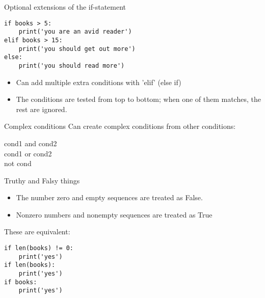 \documentclass{beamer}
\begin{document}
\begin{frame}[fragile]{Optional extensions of the if-statement}
\begin{lstlisting}
if books > 5:
    print('you are an avid reader')
elif books > 15:
    print('you should get out more')
else:
    print('you should read more')
\end{lstlisting}

\begin{itemize}
    \item Can add multiple extra conditions with 'elif' (else if)
    \item The conditions are tested from top to bottom;
            when one of them matches, the rest are ignored.
\end{itemize}
\end{frame}


\begin{frame}{Complex conditions}
    Can create complex conditions from other conditions:
    
    \begin{description}
        \item[cond1 and cond2]
        \item[cond1 or cond2]
        \item[not cond]
    \end{description}

\end{frame}

\begin{frame}[fragile]{Truthy and Falsy things}
\begin{itemize}
\item The number zero and empty sequences are treated as False.
\item Nonzero numbers and nonempty sequences are treated as True
\end{itemize}

These are equivalent:
\begin{lstlisting}
if len(books) != 0:
    print('yes')    
if len(books):
    print('yes')    
if books:
    print('yes')    
\end{lstlisting}

\end{frame}


\frame{\tableofcontents[currentsection]}
\end{document}
